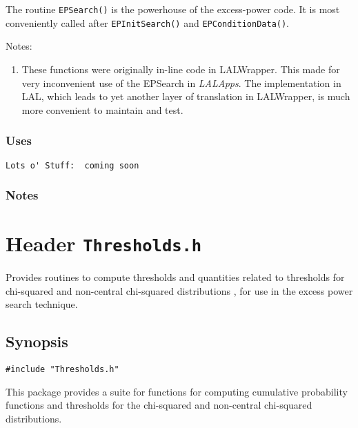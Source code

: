 The routine \verb+EPSearch()+ is the powerhouse of the excess-power
code.  It is most conveniently called after \verb+EPInitSearch()+ and 
\verb+EPConditionData()+.


Notes:
\begin{enumerate}
\item These functions were originally in-line code in LALWrapper.
This made for very inconvenient use of the EPSearch in \emph{LALApps}.
The implementation in LAL,  which leads to yet another layer of
translation in LALWrapper,  is much more convenient to maintain and
test.
\end{enumerate}

\subsubsection*{Uses}
\begin{verbatim}
Lots o' Stuff:  coming soon
\end{verbatim}
\subsubsection*{Notes}

\vfill{\footnotesize}



%
%
%
%
%
%
%
%




\newpage
\section{Header \texttt{Thresholds.h}}
\label{s:Thresholds.h}

\noindent Provides routines to compute thresholds and quantities related to
thresholds for chi-squared and non-central chi-squared distributions
\cite{ptvf:1992}, for use in the excess power search technique.

\subsection*{Synopsis}
\begin{verbatim}
#include "Thresholds.h"
\end{verbatim}

\noindent This package provides a suite for functions for computing cumulative
probability functions and thresholds for the chi-squared and non-central
chi-squared distributions.

